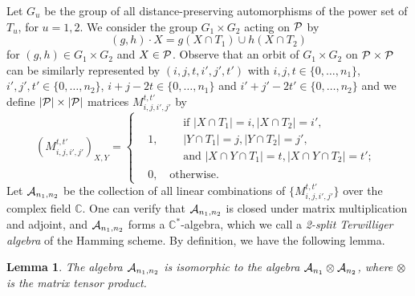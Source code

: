 \documentclass[final,onecolumn]{IEEEtran}
\newtheorem{lemmaenv}[definitionenv]{Lemma}
\newenvironment{lemma}{\begin{lemmaenv}\rm}{\end{lemmaenv}}
\theoremstyle{definition}
\begin{document}
Let $G_{u}$ be the group of all distance-preserving automorphisms of the power set of $T_{u}$, for $u = 1, 2$. We consider the group $G_{1} \times G_{2}$ acting on ${\cal P}$ by
\begin{equation*}
	(g, h) \cdot X = g(X \cap T_{1}) \cup h(X \cap T_{2})
\end{equation*}
for  $(g, h) \in G_{1} \times G_{2}$ and  $X \in {\cal P}$. Observe that an orbit of $G_{1} \times G_{2}$ on ${\cal P} \times {\cal P}$ can be similarly represented by $(i, j, t, i', j', t')$ with $i, j, t \in \{0, \dots, n_{1}\}$, $i', j', t' \in \{0, \dots, n_{2}\}$, $i+j-2t \in \{0, \dots, n_{1}\}$ and $i'+j'-2t' \in \{0, \dots, n_{2}\}$ and we define $\lvert {\cal P} \rvert \times \lvert {\cal P}\rvert$ matrices $M_{i, j, i', j'}^{t, t'}$ by
\begin{equation*}
	\left(M_{i, j, i', j'}^{t, t'}\right)_{X,Y}  = \left\{
	\begin{aligned}
		&1, \quad 
		\begin{aligned}
		    &\text{if } \lvert X \cap T_{1}\rvert = i, \lvert X \cap T_{2} \rvert = i',\\
		    &\lvert Y \cap T_{1}\rvert = j, \lvert Y \cap T_{2}\rvert = j', \\
		    &\text{and } \lvert X \cap Y \cap T_{1}\rvert = t, \lvert X \cap Y \cap T_{2}\rvert = t';
	    \end{aligned}\\
	&0, \quad \text{otherwise.}
	\end{aligned} \right.
\end{equation*}
Let ${\cal A}_{n_{1}, n_{2}}$ be the collection of all linear combinations of $\{M_{i, j, i', j'}^{t, t'}\}$ over the complex field $\mathbb{C}$. One can verify that ${\cal A}_{n_{1}, n_{2}}$ is closed under matrix multiplication and adjoint, and ${\cal A}_{n_{1}, n_{2}}$ forms a $\mathbb{C}^{*}$-algebra, which we call a \textit{2-split Terwilliger algebra} of the Hamming scheme. By definition, we have the following lemma.
\begin{lemma} \label{lem:le_1}
	The algebra ${\cal A}_{n_{1}, n_{2}}$ is isomorphic to the algebra ${\cal A}_{n_{1}} \otimes {\cal A}_{n_{2}}$, where $\otimes $ is the matrix tensor product. 
\end{lemma}
	
\end{document}
